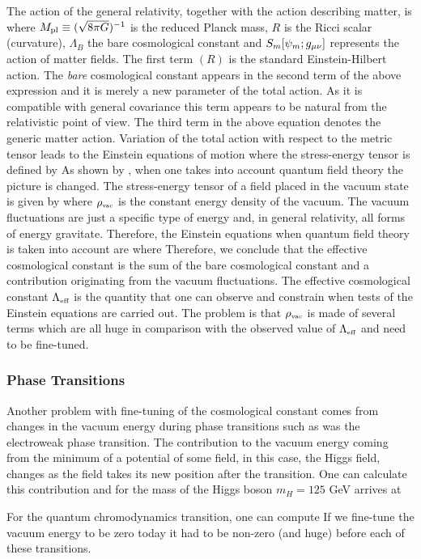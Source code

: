 The action of the general relativity, together with the action describing matter, is
where $M_{\text{\scriptsize pl}}\equiv(\sqrt{8\pi G})^{-1}$ is the reduced Planck mass, $R$ is the Ricci scalar (curvature), $\Lambda_B$ the bare cosmological constant and $S_m[\psi_m;g_{\mu\nu}]$ represents the action of matter fields. The first term $(R)$ is the standard Einstein-Hilbert action. The \textit{bare} cosmological constant appears in the second term of the above expression and it is merely a new parameter of the total action. As it is compatible with general covariance this term appears to be natural from the relativistic point of view. The third term in the above equation denotes the generic matter action. Variation of the total action with respect to the metric tensor leads to the Einstein equations of motion
where the stress-energy tensor is defined by
As shown by \textcite{1968SPhD...12.1040S}, when one takes into account quantum field theory the picture is changed. The stress-energy tensor of a field placed in the vacuum state is given by
where $\rho_\text{\tiny vac}$ is the constant energy density of the vacuum. The vacuum fluctuations are just a specific type of energy and, in general relativity, all forms of energy gravitate. Therefore, the Einstein equations when quantum field theory is taken into account are
where
Therefore, we conclude that the effective cosmological constant is the sum of the bare cosmological constant and a contribution originating from the vacuum fluctuations. The effective cosmological constant $\Lambda_\text{\tiny eff}$ is the quantity that one can observe and constrain when tests of the Einstein equations are carried out. The problem is that $\rho_\text{\tiny vac}$ is made of several terms which are all huge in comparison with the observed value of $\Lambda_\text{\tiny eff}$ and need to be fine-tuned.
\subsubsection{Phase Transitions}
\begin{sloppypar}
Another problem with fine-tuning of the cosmological constant comes from changes in the vacuum energy during phase transitions such as was the electroweak phase transition. The contribution to the vacuum energy coming from the minimum of a potential of some field, in this case, the Higgs field, changes as the field takes its new position after the transition. One can calculate this contribution \parencite{2012CRPhy..13..566M} and for the mass of the Higgs boson $m_H=125$ GeV arrives at
\end{sloppypar}
For the quantum chromodynamics transition, one can compute
If we fine-tune the vacuum energy to be zero today it had to be non-zero (and huge) before each of these transitions.
